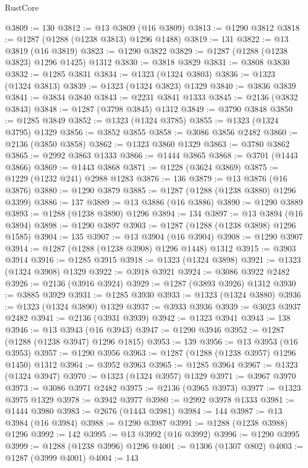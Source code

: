 \begin{lexlean}{RustCore}
\begin{coremodule}
@3809 := 130
@3812 := @13 @3809 (@16 @3809)
@3813 := @1290 @3812
@3818 := @1287 (@1288 (@1238 @3813) @1296 @1488)
@3819 := 131
@3822 := @13 @3819 (@16 @3819)
@3823 := @1290 @3822
@3829 := @1287 (@1288 (@1238 @3823) @1296 @1425) @1312
@3830 := @3818 @3829
@3831 := @3808 @3830
@3832 := @1285 @3831
@3834 := @1323 (@1324 @3803)
@3836 := @1323 (@1324 @3813)
@3839 := @1323 (@1324 @3823) @1329
@3840 := @3836 @3839
@3841 := @3834 @3840
@3843 := @2231 @3841 @1333
@3845 := @2136 (@3832 @3843)
@3848 := @1287 (@3798 @3845) @1312
@3849 := @3790 @3848
@3850 := @1285 @3849
@3852 := @1323 (@1324 @3785)
@3855 := @1323 (@1324 @3795) @1329
@3856 := @3852 @3855
@3858 := @3086 @3856 @2482
@3860 := @2136 (@3850 @3858)
@3862 := @1323 @3860 @1329
@3863 := @3780 @3862
@3865 := @2992 @3863 @1333
@3866 := @1444 @3865
@3868 := @3701 (@1443 @3866)
@3869 := @1443 @3868
@3871 := @1228 (@3624 @3869)
@3875 := @1229 (@1232 @241) @2988 @1283
@3876 := 136
@3879 := @13 @3876 (@16 @3876)
@3880 := @1290 @3879
@3885 := @1287 (@1288 (@1238 @3880) @1296 @3399)
@3886 := 137
@3889 := @13 @3886 (@16 @3886)
@3890 := @1290 @3889
@3893 := @1288 (@1238 @3890) @1296
@3894 := 134
@3897 := @13 @3894 (@16 @3894)
@3898 := @1290 @3897
@3903 := @1287 (@1288 (@1238 @3898) @1296 @1585)
@3904 := 135
@3907 := @13 @3904 (@16 @3904)
@3908 := @1290 @3907
@3914 := @1287 (@1288 (@1238 @3908) @1296 @1448) @1312
@3915 := @3903 @3914
@3916 := @1285 @3915
@3918 := @1323 (@1324 @3898)
@3921 := @1323 (@1324 @3908) @1329
@3922 := @3918 @3921
@3924 := @3086 @3922 @2482
@3926 := @2136 (@3916 @3924)
@3929 := @1287 (@3893 @3926) @1312
@3930 := @3885 @3929
@3931 := @1285 @3930
@3933 := @1323 (@1324 @3880)
@3936 := @1323 (@1324 @3890) @1329
@3937 := @3933 @3936
@3939 := @3023 @3937 @2482
@3941 := @2136 (@3931 @3939)
@3942 := @1323 @3941
@3943 := 138
@3946 := @13 @3943 (@16 @3943)
@3947 := @1290 @3946
@3952 := @1287 (@1288 (@1238 @3947) @1296 @1815)
@3953 := 139
@3956 := @13 @3953 (@16 @3953)
@3957 := @1290 @3956
@3963 := @1287 (@1288 (@1238 @3957) @1296 @1450) @1312
@3964 := @3952 @3963
@3965 := @1285 @3964
@3967 := @1323 (@1324 @3947)
@3970 := @1323 (@1324 @3957) @1329
@3971 := @3967 @3970
@3973 := @3086 @3971 @2482
@3975 := @2136 (@3965 @3973)
@3977 := @1323 @3975 @1329
@3978 := @3942 @3977
@3980 := @2992 @3978 @1333
@3981 := @1444 @3980
@3983 := @2676 (@1443 @3981)
@3984 := 144
@3987 := @13 @3984 (@16 @3984)
@3988 := @1290 @3987
@3991 := @1288 (@1238 @3988) @1296
@3992 := 142
@3995 := @13 @3992 (@16 @3992)
@3996 := @1290 @3995
@3999 := @1288 (@1238 @3996) @1296
@4001 := @1306 (@1307 @802)
@4003 := @1287 (@3999 @4001)
@4004 := 143

\end{coremodule}
\end{lexlean}
